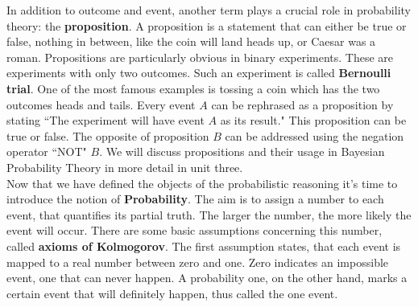 \documentclass[12pt, a4paper]{scrartcl}
\begin{document}
In addition to outcome and event, another term plays a crucial role in probability theory: the \textbf{proposition}. A proposition is a statement that can either be true or false, nothing in between, like the coin will land heads up, or Caesar was a roman. Propositions are particularly obvious in binary experiments. These are experiments with only two outcomes. Such an experiment is called \textbf{Bernoulli trial}. One of the most famous examples is tossing a coin which has the two outcomes heads and tails. 
Every event $A$ can be rephrased as a proposition by stating ``The experiment will have event $A$ as its result." This proposition can be true or false. The opposite of proposition $B$ can be addressed using the negation operator ``NOT" $B$. We will discuss propositions and their usage in Bayesian Probability Theory in more detail in unit three.
\\

Now that we have defined the objects of the probabilistic reasoning it’s time to introduce the notion of \textbf{Probability}. The aim is to assign a number to each event, that quantifies its partial truth. The larger the number, the more likely the event will occur. 
There are some basic assumptions concerning this number, called \textbf{axioms of Kolmogorov}. The first assumption states, that each event is mapped to a real number between zero and one. Zero indicates an impossible event, one that can never happen. A probability one, on the other hand, marks a certain event that will definitely happen, thus called the one event.\\

\\
\end{document}
